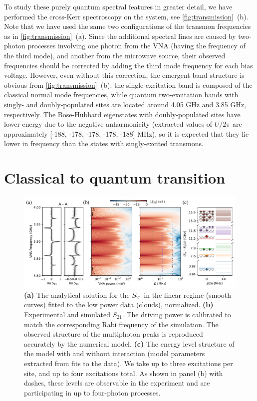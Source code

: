 \documentclass[%
 aps, pra,
 amsmath,amssymb,
 reprint,%
superscriptaddress
]{revtex4-2}
\begin{document}
To study these purely quantum spectral features in greater detail, we have performed the cross-Kerr spectroscopy on the system, see \autoref{fig:transmission}~(b). Note that we have used the same two configurations of the transmon frequencies as in \autoref{fig:transmission}~(a). Since the additional spectral lines are caused by two-photon processes involving one photon from the VNA (having the frequency of the third mode), and another from the microwave source, their observed frequencies should be corrected by adding the third mode frequency for each bias voltage. However, even without this correction, the emergent band structure is obvious from \autoref{fig:transmission}~(b): the single-excitation band is composed of the classical normal mode frequencies, while quantum two-excitation bands with singly- and doubly-populated sites are located around 4.05 GHz and 3.85 GHz, respectively. The Bose-Hubbard eigenstates with doubly-populated sites have lower energy due to the negative anharmonicity (extracted values of $U/2\pi$ are approximately [-188, -178, -178, -178, -188] MHz), so it is expected that they lie lower in frequency than the states with singly-excited transmons. 


\section{Classical to quantum transition}



\begin{figure}[t]
	\centering
	\includegraphics[width=\linewidth]{Pictures/fig3}
	\caption{\textbf{(a)} The analytical solution for the $S_{21}$ in the linear regime (smooth curves) fitted to the low power data (clouds), normalized. \textbf{(b)} Experimental and simulated $S_{21}$. The driving power is calibrated to match the corresponding Rabi frequency of the simulation. The observed structure of the multiphoton peaks is reproduced accurately by the numerical model. \textbf{(c)} The energy level structure of the model with and without interaction (model parameters extracted from fits to the data). We take up to three excitations per site, and up to four excitations total. As shown in panel (b) with dashes, these levels are observable in the experiment and are participating in up to four-photon processes.}
	\label{fig:cq_transition}
\end{figure}
\end{document}
